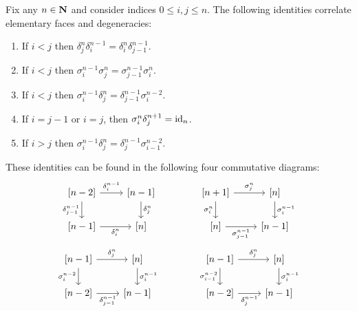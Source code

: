 \begin{corollary}
    \label{cor:cosimplicial-identities}
    Fix any \(n \in \mathbf{N}\) and consider indices \(0 \leq i, j \leq n\). The following
    identities correlate elementary faces and degeneracies:
    \begin{enumerate}[(1)]\setlength\itemsep{0em}
        \item If \(i < j\) then
              \(\delta_j^n \delta_i^{n-1} = \delta_i^n \delta_{j-1}^{n-1}\).

        \item If \(i < j\) then
              \(\sigma_i^{n-1} \sigma_j^n = \sigma_{j-1}^{n-1} \sigma_i^n \).

        \item If \(i < j\) then
              \(\sigma_i^{n-1} \delta_j^n = \delta_{j-1}^{n-1} \sigma_i^{n-2}\).

        \item If \(i = j - 1\) or \(i = j\), then \(\sigma_i^n \delta_j^{n+1} = \operatorname{id}_n\).

        \item If \(i > j\) then
              \(\sigma_i^{n-1} \delta_j^n = \delta_j^{n-1} \sigma_{i-1}^{n-2}\).
    \end{enumerate}
    These identities can be found in the following four commutative diagrams:
    \begin{equation*}
        \begin{tikzcd}
            {[n-2]} \ar[r, "\delta_i^{n-1}"] \ar[d, "\delta_{j-1}^{n-1}"']
            &{[n-1]} \ar[d, "\delta_j^n"] \\
            {[n-1]} \ar[r, "\delta_i^n"'] &{[n]}
        \end{tikzcd}
        \qquad
        \qquad
        \begin{tikzcd}
            {[n+1]} \ar[r, "\sigma_j^n"] \ar[d, "\sigma_i^n"']
            &{[n]} \ar[d, "\sigma_i^{n-1}"] \\
            {[n]} \ar[r, "\sigma_{j-1}^{n-1}"'] &{[n-1]}
        \end{tikzcd}
    \end{equation*}
    \begin{equation*}
        \begin{tikzcd}
            {[n - 1]} \ar[r, "\delta_j^n"] \ar[d, "\sigma_i^{n-2}"']
            &{[n]} \ar[d, "\sigma_i^{n-1}"] \\
            {[n-2]} \ar[r, "\delta_{j-1}^{n-1}"'] &{[n-1]}
        \end{tikzcd}
        \qquad
        \qquad
        \begin{tikzcd}
            {[n - 1]} \ar[r, "\delta_j^n"] \ar[d, "\sigma_{i-1}^{n-2}"']
            &{[n]} \ar[d, "\sigma_i^{n-1}"] \\
            {[n-2]} \ar[r, "\delta_j^{n-1}"'] &{[n-1]}
        \end{tikzcd}
    \end{equation*}
\end{corollary}

